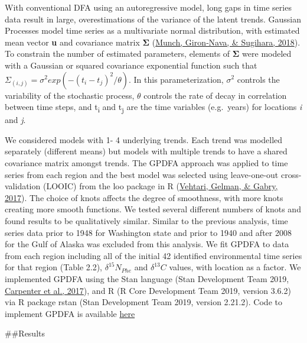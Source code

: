 \documentclass [11pt, proquest] {uwthesis}[2015/03/03]
\begin{document}
With conventional DFA using an autoregressive model, long gaps in time series data result in large, overestimations of the variance of the latent trends. Gaussian Processes model time series as a multivariate normal distribution, with estimated mean vector \textbf{u} and covariance matrix \textbf{Σ} (\protect\hyperlink{ref-Munch2018}{Munch, Giron‐Nava, \& Sugihara, 2018}). To constrain the number of estimated parameters, elements of \textbf{Σ} were modeled with a Gaussian or squared covariance exponential function such that \(\Sigma_{(i,j)}= \sigma^2 exp(-(t_i-t_j )^2/\theta)\). In this parameterization, \(\sigma^2\) controls the variability of the stochastic process, \(\theta\) controls the rate of decay in correlation between time steps, and t\textsubscript{i} and t\textsubscript{j} are the time variables (e.g.~years) for locations \emph{i} and \emph{j}.

We considered models with 1- 4 underlying trends. Each trend was modelled separately (different means) but models with multiple trends to have a shared covariance matrix amongst trends. The GPDFA approach was applied to time series from each region and the best model was selected using leave-one-out cross-validation (LOOIC) from the loo package in R (\protect\hyperlink{ref-Vehtari2017}{Vehtari, Gelman, \& Gabry, 2017}). The choice of knots affects the degree of smoothness, with more knots creating more smooth functions. We tested several different numbers of knots and found results to be qualitatively similar. Similar to the previous analysis, time series data prior to 1948 for Washington state and prior to 1940 and after 2008 for the Gulf of Alaska was excluded from this analysis. We fit GPDFA to data from each region including all of the initial 42 identified environmental time series for that region (Table 2.2), \(\delta^{15}N_{Phe}\) and \(\delta^{13}C\) values, with location as a factor. We implemented GPDFA using the Stan language (Stan Development Team 2019, \protect\hyperlink{ref-Carpenter2017}{Carpenter et al., 2017}), and R (R Core Development Team 2019, version 3.6.2) via R package rstan (Stan Development Team 2019, version 2.21.2). Code to implement GPDFA is available \href{https://github.com/mfeddern/CSIA-AA/blob/master/SourceData/Src/Analysis/gpdfa.stan}{here}

\#\#Results
\end{document}
